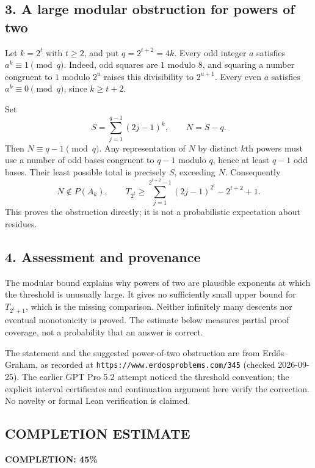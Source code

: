 \subsection*{3. A large modular obstruction for powers of two}
Let $k=2^t$ with $t\ge2$, and put $q=2^{t+2}=4k$. Every odd integer $a$
satisfies $a^k\equiv1\pmod q$. Indeed, odd squares are $1$ modulo $8$,
and squaring a number congruent to $1$ modulo $2^u$ raises this
divisibility to $2^{u+1}$. Every even $a$ satisfies $a^k\equiv0\pmod q$,
since $k\ge t+2$.

Set
\[
 S=\sum_{j=1}^{q-1}(2j-1)^k,\qquad N=S-q.
\]
Then $N\equiv q-1\pmod q$. Any representation of $N$ by distinct
$k$th powers must use a number of odd bases congruent to $q-1$ modulo
$q$, hence at least $q-1$ odd bases. Their least possible total is
precisely $S$, exceeding $N$. Consequently
\[
 N\notin P(A_k),\qquad
 T_{2^t}\ge\sum_{j=1}^{2^{t+2}-1}(2j-1)^{2^t}-2^{t+2}+1.
\]
This proves the obstruction directly; it is not a probabilistic
expectation about residues.

\subsection*{4. Assessment and provenance}
The modular bound explains why powers of two are plausible exponents
at which the threshold is unusually large. It gives no sufficiently
small upper bound for $T_{2^t+1}$, which is the missing comparison.
Neither infinitely many descents nor eventual monotonicity is proved.
The estimate below measures partial proof coverage, not a probability
that an answer is correct.

The statement and the suggested power-of-two obstruction are from
Erd\H{o}s--Graham, as recorded at
\texttt{https://www.erdosproblems.com/345} (checked 2026-09-25).
The earlier GPT Pro 5.2 attempt noticed the threshold convention;
the explicit interval certificates and continuation argument here
verify the correction. No novelty or formal Lean verification is claimed.
\subsection*{COMPLETION ESTIMATE}
\textbf{COMPLETION: 45\%}
